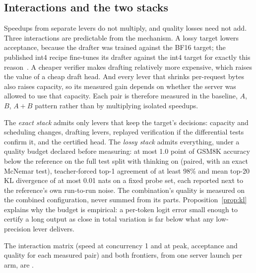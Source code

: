\subsection{Interactions and the two stacks}\label{sec:stack-stacks}
Speedups from separate levers do not multiply, and quality losses need not add. Three interactions are predictable from the mechanism. A lossy target lowers acceptance, because the drafter was trained against the BF16 target; the published int4 recipe fine-tunes its drafter against the int4 target for exactly this reason~\cite{nota2026}. A cheaper verifier makes drafting relatively more expensive, which raises the value of a cheap draft head. And every lever that shrinks per-request bytes also raises capacity, so its measured gain depends on whether the server was allowed to use that capacity. Each pair is therefore measured in the baseline, $A$, $B$, $A{+}B$ pattern rather than by multiplying isolated speedups.

The \emph{exact stack} admits only levers that keep the target's decisions: capacity and scheduling changes, drafting levers, replayed verification if the differential tests confirm it, and the certified head. The \emph{lossy stack} admits everything, under a quality budget declared before measuring: at most 1.0 point of GSM8K accuracy below the reference on the full test split with thinking on (paired, with an exact McNemar test), teacher-forced top-1 agreement of at least 98\% and mean top-20 KL divergence of at most 0.01 nats on a fixed probe set, each reported next to the reference's own run-to-run noise. The combination's quality is measured on the combined configuration, never summed from its parts. Proposition~\ref{prop:kl} explains why the budget is empirical: a per-token logit error small enough to certify a long output as close in total variation is far below what any low-precision lever delivers.

The interaction matrix (speed at concurrency 1 and at peak, acceptance and quality for each measured pair) and both frontiers, from one server launch per arm, are .

